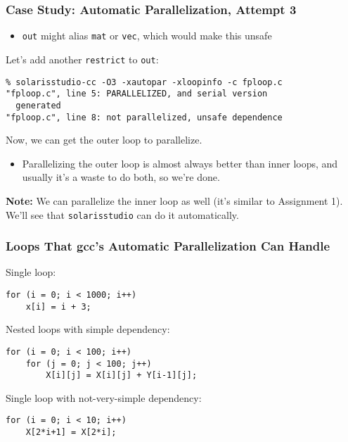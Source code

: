 \documentclass[aspectratio=43]{beamer}
\newenvironment{changemargin}[1]{%
  \begin{list}{}{%
    \setlength{\topsep}{0pt}%
    \setlength{\leftmargin}{#1}%
    \setlength{\rightmargin}{1em}
    \setlength{\listparindent}{\parindent}%
    \setlength{\itemindent}{\parindent}%
    \setlength{\parsep}{\parskip}%
  }%
  \item[]}{\end{list}}
\begin{document}
\begin{frame}[fragile]
  \frametitle{Case Study: Automatic Parallelization, Attempt 3}

\begin{changemargin}{1cm}
  \begin{itemize}
    \item {\tt out} might alias {\tt mat} or {\tt vec}, which would make this
      unsafe
  \end{itemize}

  Let's add another {\tt restrict} to {\tt out}:

  \begin{lstlisting}
% solarisstudio-cc -O3 -xautopar -xloopinfo -c fploop.c
"fploop.c", line 5: PARALLELIZED, and serial version
  generated
"fploop.c", line 8: not parallelized, unsafe dependence
  \end{lstlisting}

  Now, we can get the outer loop to parallelize.
  
  \begin{itemize}
    \item Parallelizing the outer loop is almost always better than inner loops,
      and usually it's a waste to do both, so we're done.
  \end{itemize}

  {\bf Note:} We can parallelize the inner loop as well (it's similar to
  Assignment 1). We'll see that {\tt solarisstudio} can do it automatically.
\end{changemargin}

\end{frame}

\begin{frame}[fragile]
  \frametitle{Loops That gcc's Automatic Parallelization Can Handle}

\begin{changemargin}{2.5cm}
  Single loop:
  \begin{lstlisting}
for (i = 0; i < 1000; i++)
    x[i] = i + 3;
  \end{lstlisting}
  \vfill
  Nested loops with simple dependency:
  \begin{lstlisting}
for (i = 0; i < 100; i++)
    for (j = 0; j < 100; j++)
        X[i][j] = X[i][j] + Y[i-1][j];
  \end{lstlisting}
  \vfill
  Single loop with not-very-simple dependency:
  \begin{lstlisting}
for (i = 0; i < 10; i++)
    X[2*i+1] = X[2*i];
  \end{lstlisting}
\end{changemargin}
\end{frame}
\end{document}
